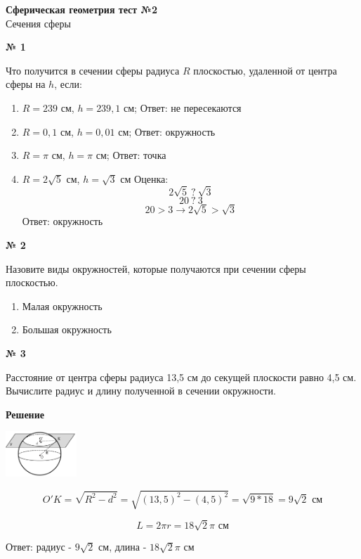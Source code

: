 


    \begin{center}
        \textbf{Сферическая геометрия тест №2}\\
        Сечения сферы
    \end{center}

    \begin{center}
        \textbf{№ 1}
    \end{center}

    Что получится в сечении сферы радиуса $R$ плоскостью, удаленной от центра сферы на $h$, если:
    \begin{enumerate}
        \item $R = 239$ см, $h = 239,1$ см;
        Ответ: не пересекаются

        \item $R = 0,1$ см, $h = 0,01$ см;
        Ответ: окружность

        \item $R = \pi$ см, $h = \pi$ см;
        Ответ: точка

        \item $R = 2\sqrt{5}$ см, $h = \sqrt{3}$ см
        Оценка:
        \[ 2\sqrt {5} \ ? \ \sqrt {3}  \]
        \[ 20 \ ? \ 3 \]
        \[ 20 > 3 \rightarrow 2\sqrt {5} > \sqrt {3} \]
        Ответ: окружность
    \end{enumerate}

    \begin{center}
        \textbf{№ 2}
    \end{center}

    Назовите виды окружностей, которые получаются при сечении сферы плоскостью.
    \begin{enumerate}
        \item Малая окружность
        \item Большая окружность
    \end{enumerate}

    \begin{center}
        \textbf{№ 3}
    \end{center}

    Расстояние от центра сферы радиуса 13,5 см до секущей плоскости равно 4,5 см.
    Вычислите радиус и длину полученной в сечении окружности.

    \textbf{Решение}\\

    \begin{center}
        \includegraphics[width=0.2\textwidth]{images/img1}\\
    \end{center}


        \[  O'K =  \sqrt{R ^ 2 - d ^ 2} = \sqrt{(13,5) ^ 2 - (4,5) ^ 2} = \sqrt {9 * 18} = 9\sqrt {2} \text{ см}\]

        \[ L = 2\pi r = 18\sqrt {2} \pi  \text{ см}\]

    Ответ: радиус - $9\sqrt{2}$ см, длина - $18\sqrt {2} \pi$ см


